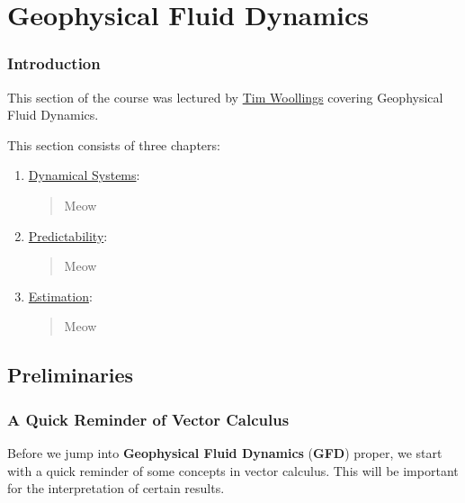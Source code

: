 \part{Geophysical Fluid Dynamics}\label{Geophysical Fluid Dynamics}

\section*{Introduction}

This section of the course was lectured by \href{https://www.physics.ox.ac.uk/our-people/woollings}{Tim Woollings} covering Geophysical Fluid Dynamics.\vspace{5 mm}

\noindent This section consists of three chapters:\vspace{5 mm}

\begin{enumerate}
    \item \hyperref[Dynamical Systems]{Dynamical Systems}: 
        
        \begin{quote}
            Meow
        \end{quote}

    \item \hyperref[Predictability]{Predictability}: 
    
        \begin{quote}
            Meow
        \end{quote}
    
    \item \hyperref[Estimation]{Estimation}:
        
        \begin{quote}
            Meow
        \end{quote}
\end{enumerate}

\chapter{Preliminaries}

\section{A Quick Reminder of Vector Calculus}

Before we jump into \textbf{Geophysical Fluid Dynamics} (\textbf{GFD}) proper, we start with a quick reminder of some concepts in vector calculus. This will be important for the interpretation of certain results.

